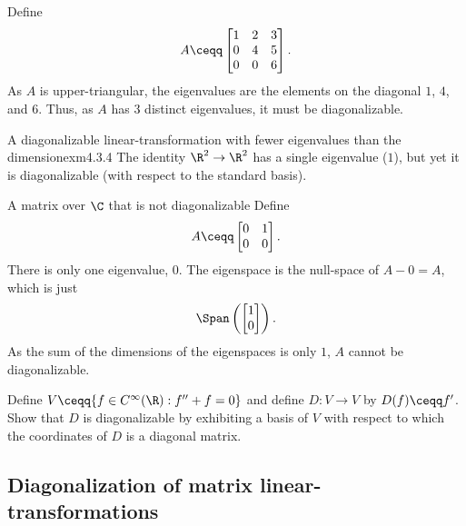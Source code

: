 \begin{exm}{}{}
	Define
	\begin{equation}
		A\ceqq \begin{bmatrix}1 & 2 & 3 \\ 0 & 4 & 5 \\ 0 & 0 & 6\end{bmatrix}.
	\end{equation}
	As $A$ is upper-triangular, the eigenvalues are the elements on the diagonal  $1$, $4$, and $6$.  Thus, as $A$ has $3$ distinct eigenvalues, it must be diagonalizable.
\end{exm}
\begin{exm}{A diagonalizable linear-transformation with fewer eigenvalues than the dimension}{exm4.3.4}
	The identity $\R ^2\rightarrow \R ^2$ has a single eigenvalue ($1$), but yet it is diagonalizable (with respect to the standard basis).
\end{exm}
\begin{exm}{A matrix over $\C$ that is not diagonalizable}{}
	Define
	\begin{equation}
		A\ceqq \begin{bmatrix}0 & 1 \\ 0 & 0\end{bmatrix}.
	\end{equation}
	There is only one eigenvalue, $0$.  The eigenspace is the null-space of $A-0=A$, which is just
	\begin{equation}
		\Span \left( \begin{bmatrix}1 \\ 0\end{bmatrix}\right) .
	\end{equation}
	As the sum of the dimensions of the eigenspaces is only $1$, $A$ cannot be diagonalizable.
\end{exm}
\begin{exr}{}{}
	Define $V\ceqq \{ f\in C^{\infty}(\R ):f''+f=0\}$ and define $D\colon V\rightarrow V$ by $D(f)\ceqq f'$.  Show that $D$ is diagonalizable by exhibiting a basis of $V$ with respect to which the coordinates of $D$ is a diagonal matrix.
\end{exr}

\subsection{Diagonalization of matrix linear-transformations}

